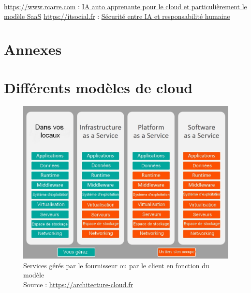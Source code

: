 \documentclass[a4paper, 12pt]{article}
\begin{document}
\begin{spacing}{1.1}
\begin{thebibliography}{3}
    \bibitem{} \url{https://www.rcarre.com} : \href{https://www.rcarre.com/blog/intelligence-artificielle-auto-apprenante-pour-le-cloud-and-saas/}{IA auto apprenante pour le cloud et particulièrement le modèle SaaS}
    \bibitem{} \url{https://itsocial.fr} : \href{https://itsocial.fr/partenaires/oracle-partenaire/tribunes-oracle/securite-du-cloud-entre-intelligence-artificielle-et-responsabilite-humaine/}{Sécurité entre IA et responsabilité humaine}
  \end{thebibliography}

  \newpage
  \section*{Annexes}
  \appendix
    \section{Différents modèles de cloud}
      \begin{figure}[h]
        \centering
        \includegraphics[scale=.4]{img/modeles.jpg}
        \caption{Services gérés par le fournisseur ou par le client en
        fonction du modèle \\ Source : \url{https://architecture-cloud.fr}}
      \end{figure}
      \label{modeles}
  \end{spacing}
\end{document}
